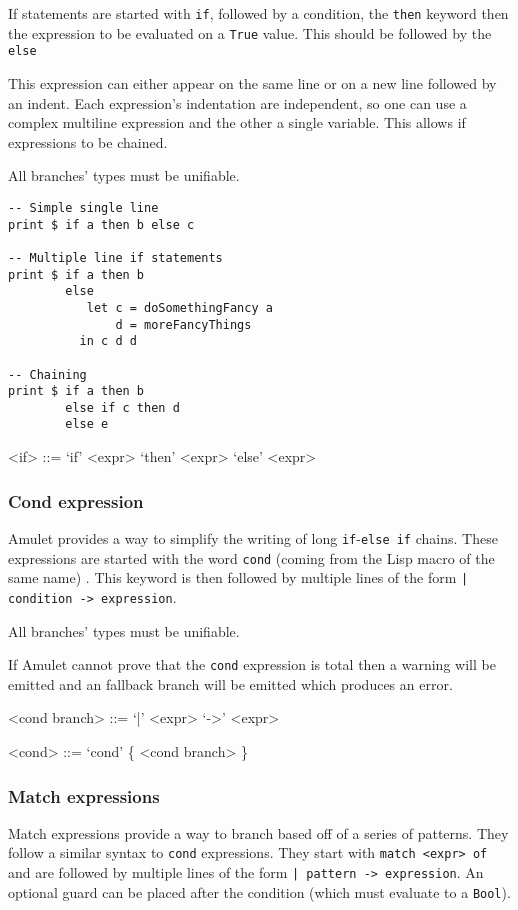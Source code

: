 If statements are started with \texttt{if}, followed by a condition, the \texttt{then} keyword then the expression to be evaluated on a \texttt{True} value. This should be followed by the \texttt{else}

This expression can either appear on the same line or on a new line followed by an indent. Each expression’s indentation are independent, so one can use a complex multiline expression and the other a single variable. This allows if expressions to be chained.

All branches’ types must be unifiable.

\begin{verbatim}
-- Simple single line
print $ if a then b else c

-- Multiple line if statements
print $ if a then b
        else
           let c = doSomethingFancy a
               d = moreFancyThings
          in c d d

-- Chaining
print $ if a then b
        else if c then d
        else e
\end{verbatim}

\begin{grammar}
<if> ::= `if' <expr> `then' <expr> `else' <expr>
\end{grammar}

\subsubsection{Cond expression}
Amulet provides a way to simplify the writing of long \texttt{if}-\texttt{else if} chains. These expressions are started with the word \texttt{cond} (coming from the Lisp macro of the same name\cite{lispCond}) . This keyword is then followed by multiple lines of the form \texttt{| condition -> expression}.

All branches’ types must be unifiable.

If Amulet cannot prove that the \texttt{cond} expression is total then a warning will be emitted and an fallback branch will be emitted which produces an error.

\begin{grammar}
<cond branch> ::= `|' <expr> `->' <expr>

<cond> ::= `cond' \{ <cond branch> \}
\end{grammar}

\subsubsection{Match expressions}
Match expressions provide a way to branch based off of a series of patterns. They follow a similar syntax to \texttt{cond} expressions. They start with \texttt{match <expr> of} and are followed by multiple lines of the form \texttt{| pattern -> expression}. An optional guard can be placed after the condition (which must evaluate to a \texttt{Bool}).

